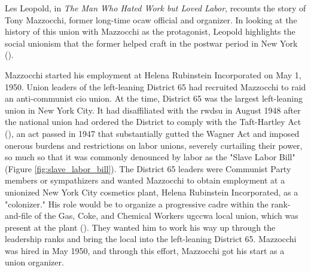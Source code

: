 \documentclass[12pt]{article}
\begin{document}
Les Leopold, in \textit{The Man Who Hated Work but Loved Labor}, recounts the story of Tony Mazzocchi, former long-time \acrfull{ocaw} official and organizer. In looking at the history of this union with Mazzocchi as the protagonist, Leopold highlights the social unionism that the former helped craft in the postwar period in New York (\cite[16]{leopoldManWhoHated2007}).

Mazzocchi started his employment at Helena Rubinstein Incorporated on May 1, 1950. Union leaders of the left-leaning District 65 had recruited Mazzocchi to raid an anti-communist \acrshort{cio} union. At the time, District 65 was the largest left-leaning union in New York City. It had disaffiliated with the \acrfull{rwdsu} in August 1948 after the national union had ordered the District to comply with the Taft-Hartley Act (\cite{leopoldManWhoHated2007}), an act passed in 1947 that substantially gutted the Wagner Act and imposed onerous burdens and restrictions on labor unions, severely curtailing their power, so much so that it was commonly denounced by labor as the "Slave Labor Bill" (Figure \ref{fig:slave_labor_bill}). The District 65 leaders were Communist Party members or sympathizers and wanted Mazzocchi to obtain employment at a unionized New York City cosmetics plant, Helena Rubinstein Incorporated, as a "colonizer." His role would be to organize a progressive cadre within the rank-and-file of the Gas, Coke, and Chemical Workers \acrshort{ugccwa} local union, which was present at the plant (\cite[71]{leopoldManWhoHated2007}). They wanted him to work his way up through the leadership ranks and bring the local into the left-leaning District 65. Mazzocchi was hired in May 1950, and through this effort, Mazzocchi got his start as a union organizer.
\end{document}
